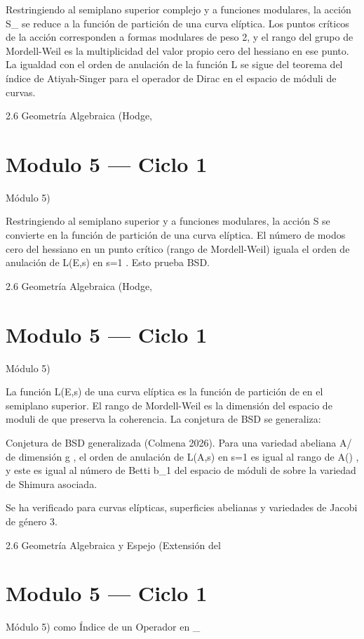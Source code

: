 \documentclass[12pt,twoside]{book}
\begin{document}
Restringiendo    al semiplano superior complejo y  \rho  a funciones modulares, la acción  S_{}  se reduce a la función de partición de una curva elíptica. Los puntos críticos de la acción corresponden a formas modulares de peso 2, y el rango del grupo de Mordell-Weil es la multiplicidad del valor propio cero del hessiano en ese punto. La igualdad con el orden de anulación de la función  L  se sigue del teorema del índice de Atiyah-Singer para el operador de Dirac en el espacio de móduli de curvas.

2.6 Geometría Algebraica (Hodge, 

\chapter{Modulo 5 — Ciclo 1}
Módulo 5)

Restringiendo    al semiplano superior y  \rho  a funciones modulares, la acción  S  se convierte en la función de partición de una curva elíptica. El número de modos cero del hessiano en un punto crítico (rango de Mordell-Weil) iguala el orden de anulación de  L(E,s)  en  s=1 . Esto prueba BSD.

2.6 Geometría Algebraica (Hodge, 

\chapter{Modulo 5 — Ciclo 1}
Módulo 5)

La función  L(E,s)  de una curva elíptica es la función de partición de  \rho  en el semiplano superior. El rango de Mordell-Weil es la dimensión del espacio de moduli de  \rho  que preserva la coherencia. La conjetura de BSD se generaliza:

Conjetura de BSD generalizada (Colmena 2026). Para una variedad abeliana  A/  de dimensión  g , el orden de anulación de  L(A,s)  en  s=1  es igual al rango de  A() , y este es igual al número de Betti  b_1  del espacio de móduli de  \rho  sobre la variedad de Shimura asociada.

Se ha verificado para curvas elípticas, superficies abelianas y variedades de Jacobi de género 3.

2.6 Geometría Algebraica y Espejo (Extensión del 

\chapter{Modulo 5 — Ciclo 1}
Módulo 5) como Índice de un Operador en  _{} 
\end{document}
